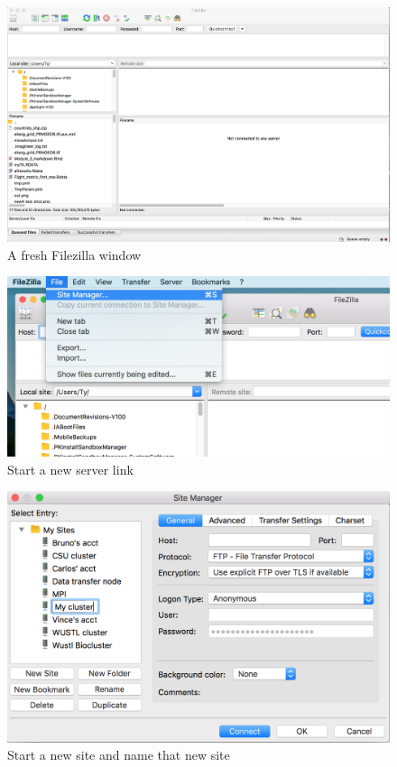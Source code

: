 \documentclass[]{book}
\theoremstyle{definition}
\theoremstyle{definition}
\theoremstyle{remark}
\begin{document}
\begin{figure}
\centering
\includegraphics{Filezilla.png}
\caption{A fresh Filezilla window}
\end{figure}

\begin{figure}
\centering
\includegraphics{site manager.png}
\caption{Start a new server link}
\end{figure}

\begin{figure}
\centering
\includegraphics{New site name.png}
\caption{Start a new site and name that new site}
\end{figure}
\end{document}
